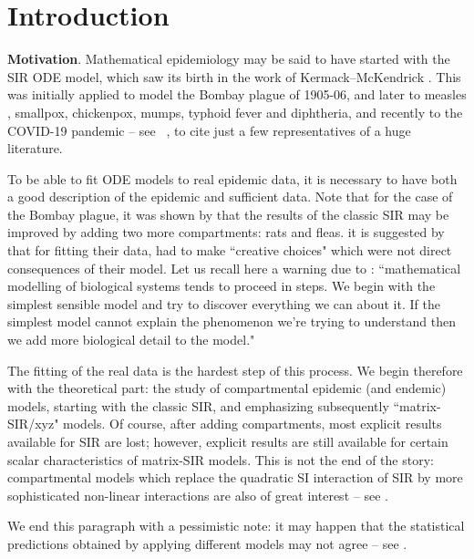 \section{Introduction}
{\bf Motivation}.
{Mathematical epidemiology  may be said to have started with the SIR ODE model, which saw its birth in the work of
Kermack–McKendrick  \cite{KeMcK}. This was initially applied to model the  Bombay plague of 1905-06, and later to  measles \cite{earn2008light}, smallpox,
chickenpox, mumps, typhoid fever and diphtheria, and recently to the COVID-19 pandemic -- see \fe\ \cite{Schaback,bacaer2020modele,Ketch,Charp,Djidjou,Sofonea,alvarez2020simple,horstmeyer2020balancing,
di2020optimal,Franco,baker2020reactive,caulkins2020long,caulkins2021optimal}, to cite just a few representatives of a huge literature.}

\iffalse
To be able  to fit ODE models to real epidemic data, it is necessary  to have both a good description of the epidemic and sufficient data.
 Note that for the case of the  Bombay plague, it was shown by \cite{bacaer2012model} that the results of the classic SIR may be improved by  adding two more compartments: rats and fleas. \Fr it is suggested by \cite{bacaer2012model} that for fitting their data, \cite{KeMcK} had to make ``creative choices" which were not direct consequences of their model. Let us recall here a warning due to   \cite{earn2008light}: ``mathematical modelling of biological systems tends to proceed in steps. We
begin with the simplest sensible model and try to discover everything we can
about it. If the simplest model cannot explain the phenomenon we’re trying
to understand then we add more biological detail to the model."

The fitting of the real data is the hardest step of this process. We begin therefore with the theoretical part: the study of
compartmental epidemic (and endemic) models, starting with the classic SIR, and emphasizing subsequently ``matrix-SIR/xyz" models.  Of course, after adding compartments, most explicit results available for SIR are lost; however, explicit results are still available for certain scalar characteristics of matrix-SIR models. This is not the end of the story:  compartmental models which replace  the quadratic SI interaction   %
of SIR  by more  sophisticated non-linear interactions are also of great interest -- see \fe \cite{capasso2008mathematical,Bohner}.

We end this paragraph  with a pessimistic note: it may happen  that the statistical predictions obtained by applying
different models may not  agree -- see \cite{Loisel,massonis2020structural}.

